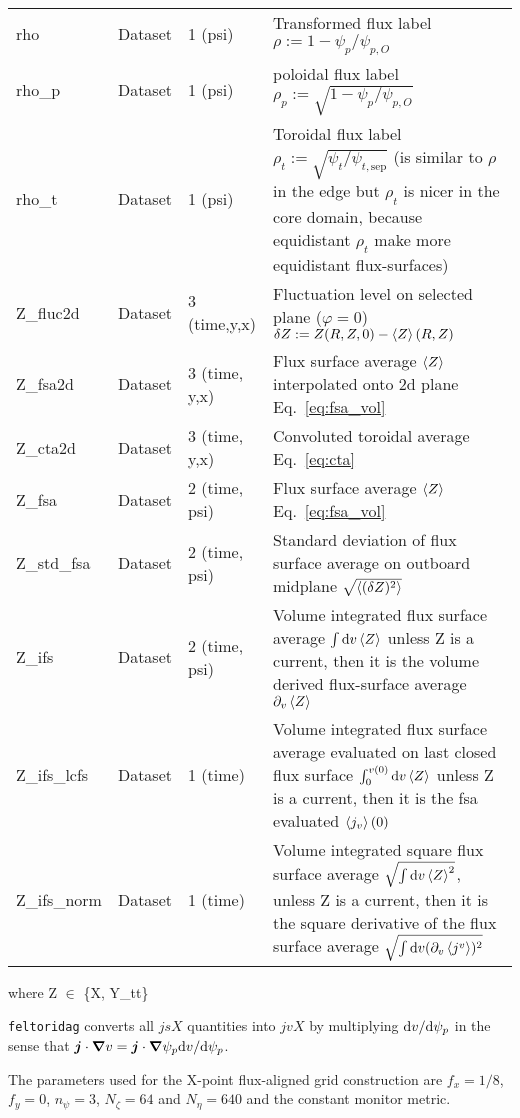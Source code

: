 \begin{longtable}{lll>{\RaggedRight}p{7cm}}
rho              & Dataset & 1 (psi) & Transformed flux label $\rho:= 1 - \psi_p/\psi_{p,O}$ \\
rho\_p           & Dataset & 1 (psi) & poloidal flux label $\rho_p:= \sqrt{1 - \psi_p/\psi_{p,O}}$ \\
rho\_t           & Dataset & 1 (psi) & Toroidal flux label $\rho_t := \sqrt{\psi_t/\psi_{t,\mathrm{sep}}}$ (is similar to $\rho$ in the edge but $\rho_t$ is nicer in the core domain, because equidistant $\rho_t$ make more equidistant flux-surfaces)\\
Z\_fluc2d        & Dataset & 3 (time,y,x) & Fluctuation level on selected plane ($\varphi= 0$) $\delta Z := Z(R,Z,0) - \left \langle  Z \right \rangle(R,Z)$ \\
Z\_fsa2d         & Dataset & 3 (time, y,x) & Flux surface average $\left \langle  Z \right \rangle$ interpolated onto 2d plane Eq.~\eqref{eq:fsa_vol} \\
Z\_cta2d         & Dataset & 3 (time, y,x) & Convoluted toroidal average Eq.~\eqref{eq:cta} \\
Z\_fsa           & Dataset & 2 (time, psi) & Flux surface average $\left \langle  Z \right \rangle$ Eq.~\eqref{eq:fsa_vol} \\
Z\_std\_fsa      & Dataset & 2 (time, psi) & Standard deviation of flux surface average on outboard midplane $\sqrt{\left \langle (\delta Z)^2 \right \rangle}$ \\
Z\_ifs           & Dataset & 2 (time, psi) & Volume integrated flux surface average $\int\mathrm{d} v\left \langle  Z \right \rangle$ unless Z is a current, then it is the volume derived flux-surface average $\partial_v \left \langle  Z \right \rangle$ \\
Z\_ifs\_lcfs     & Dataset & 1 (time) & Volume integrated flux surface average evaluated on last closed flux surface $\int_0^{v(0)}\mathrm{d} v\left \langle  Z \right \rangle$ unless Z is a current, then it is the fsa evaluated $\left \langle  j_v \right \rangle(0)$ \\
Z\_ifs\_norm     & Dataset & 1 (time) & Volume integrated square flux surface average $\sqrt{\int \mathrm{d} v \left \langle Z \right \rangle^2}$, unless Z is a current, then it is the square derivative of the flux surface average $\sqrt{\int\mathrm{d} v (\partial_v \left \langle j^v \right \rangle)^2}$\\
\bottomrule
\end{longtable}
where Z $\in$ \{X, Y\_tt\}
\begin{tcolorbox}[title=Note]
\texttt{feltoridag} converts all $jsX$ quantities into $jvX$
by multiplying $\mathrm{d} v/\mathrm{d} \psi_p$
in the sense that ${\boldsymbol{j}}\cdot{\boldsymbol{\nabla}} v  = {\boldsymbol{j}} \cdot{\boldsymbol{\nabla}} \psi_p \mathrm{d} v/\mathrm{d}\psi_p$.
\end{tcolorbox}
The parameters used for the X-point flux-aligned grid construction are $f_x = 1/8$, $f_y = 0$, $n_\psi = 3$, $N_\zeta = 64$ and $N_\eta = 640$ and the constant monitor metric.

